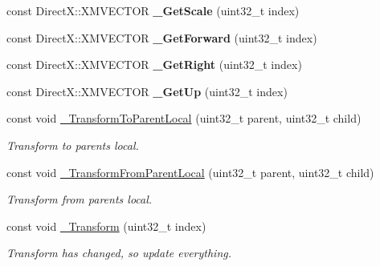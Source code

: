 \begin{DoxyCompactItemize}
\item 
const Direct\+X\+::\+X\+M\+V\+E\+C\+T\+OR {\bfseries \+\_\+\+Get\+Scale} (uint32\+\_\+t index)\hypertarget{class_ensum_1_1_components_1_1_transform_manager_a05cdff28571a120d279fd0428f08b5fd}{}\label{class_ensum_1_1_components_1_1_transform_manager_a05cdff28571a120d279fd0428f08b5fd}

\item 
const Direct\+X\+::\+X\+M\+V\+E\+C\+T\+OR {\bfseries \+\_\+\+Get\+Forward} (uint32\+\_\+t index)\hypertarget{class_ensum_1_1_components_1_1_transform_manager_aa137f5b348c0c8844abce56c47b5f564}{}\label{class_ensum_1_1_components_1_1_transform_manager_aa137f5b348c0c8844abce56c47b5f564}

\item 
const Direct\+X\+::\+X\+M\+V\+E\+C\+T\+OR {\bfseries \+\_\+\+Get\+Right} (uint32\+\_\+t index)\hypertarget{class_ensum_1_1_components_1_1_transform_manager_aba2e3fb3988acbcd49d07d2299e0a93d}{}\label{class_ensum_1_1_components_1_1_transform_manager_aba2e3fb3988acbcd49d07d2299e0a93d}

\item 
const Direct\+X\+::\+X\+M\+V\+E\+C\+T\+OR {\bfseries \+\_\+\+Get\+Up} (uint32\+\_\+t index)\hypertarget{class_ensum_1_1_components_1_1_transform_manager_a52a759a25c0129168670fc572693656f}{}\label{class_ensum_1_1_components_1_1_transform_manager_a52a759a25c0129168670fc572693656f}

\item 
const void \hyperlink{class_ensum_1_1_components_1_1_transform_manager_a50bed80577a1a6b97b9dbbf1fea2bc93}{\+\_\+\+Transform\+To\+Parent\+Local} (uint32\+\_\+t parent, uint32\+\_\+t child)
\begin{DoxyCompactList}\small\item\em Transform to parents local. \end{DoxyCompactList}\item 
const void \hyperlink{class_ensum_1_1_components_1_1_transform_manager_a860ac4eb9d36ae8c4077225f8323102f}{\+\_\+\+Transform\+From\+Parent\+Local} (uint32\+\_\+t parent, uint32\+\_\+t child)
\begin{DoxyCompactList}\small\item\em Transform from parents local. \end{DoxyCompactList}\item 
const void \hyperlink{class_ensum_1_1_components_1_1_transform_manager_abba8eea1db8554cb1aba12bc7eb57d1d}{\+\_\+\+Transform} (uint32\+\_\+t index)
\begin{DoxyCompactList}\small\item\em Transform has changed, so update everything. \end{DoxyCompactList}\end{DoxyCompactItemize}
